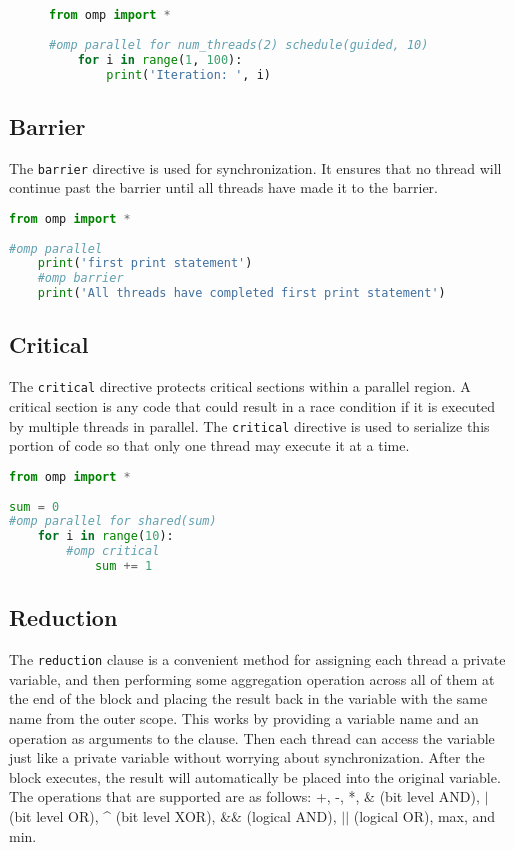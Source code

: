 \documentclass[letterpaper,12pt]{article} %
\begin{document}
\begin{figure}[H]
\begin{lstlisting}[language=Python]
from omp import *
 
#omp parallel for num_threads(2) schedule(guided, 10)
	for i in range(1, 100):
		print('Iteration: ', i)
\end{lstlisting}
\end{figure}

 
 \subsection{Barrier}
 The \texttt{barrier} directive is used for synchronization. It ensures that no thread will continue past the barrier until all threads have made it to the barrier. 
  
 \begin{lstlisting}[language=Python]
from omp import *
 
#omp parallel
	print('first print statement')
	#omp barrier
	print('All threads have completed first print statement')
\end{lstlisting} 



 \subsection{Critical}
 The \texttt{critical} directive protects critical sections within a parallel region. A critical section is any code that could result in a race condition if it is executed by multiple threads in parallel. The \texttt{critical} directive is used to serialize this portion of code so that only one thread may execute it at a time. 
 
 \begin{lstlisting}[language=Python]
from omp import *
 
sum = 0
#omp parallel for shared(sum)
	for i in range(10):
		#omp critical
			sum += 1
\end{lstlisting}



\subsection{Reduction} 
The \texttt{reduction} clause is a convenient method for assigning each thread a private variable, and then performing some aggregation operation across all of them at the end of the block and placing the result back in the variable with the same name from the outer scope. This works by providing a variable name and an operation as arguments to the clause. Then each thread can access the variable just like a private variable without worrying about synchronization. After the block executes, the result will automatically be placed into the original variable. The operations that are supported are as follows: +, -, *, \& (bit level AND), $|$ (bit level OR), \^{} (bit level XOR), \&\& (logical AND), $||$ (logical OR), max, and min.
\end{document}
